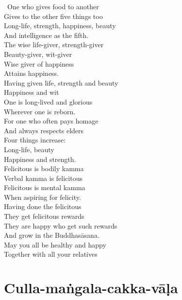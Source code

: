 \begin{english-verses}
  \anglebracketleft\ \hspace{-0.5mm}One who gives food to another \hspace{-0.5mm}\anglebracketright\ \\
  Gives to the other five things too\\
  Long-life, strength, happiness, beauty\\
  And intelligence as the fifth.\\
  The wise life-giver, strength-giver\\
  Beauty-giver, wit-giver\\
  Wise giver of happiness\\
  Attains happiness.\\
  Having given life, strength and beauty\\
  Happiness and wit\\
  One is long-lived and glorious\\
  Wherever one is reborn.\\
  For one who often pays homage\\
  And always respects elders\\
  Four things increase:\\
  Long-life, beauty\\
  Happiness and strength.\\
  Felicitous is bodily kamma\\
  Verbal kamma is felicitous\\
  Felicitous is mental kamma\\
  When aspiring for felicity.\\
  Having done the felicitous\\
  They get felicitous rewards\\
  They are happy who get such rewards\\
  And grow in the Buddhasāsana.\\
  May you all be healthy and happy\\
  Together with all your relatives
\end{english-verses}

\suttaRef{[AN 5.37 / Dhp 109 / AN 3.155]}

\section{Culla-maṅgala-cakka-vāḷa}
\label{culla-mangala-cakka-vala}

